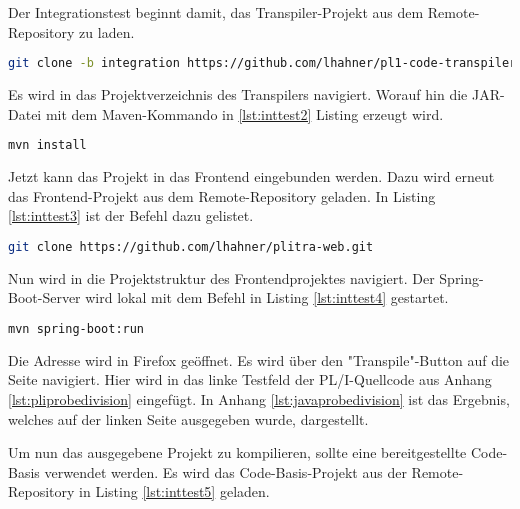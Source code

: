 Der Integrationstest beginnt damit, das Transpiler-Projekt aus dem Remote-Repository zu laden.

\begin{lstlisting}[language=Bash, caption=Laden des Transpilers, label={lst:inttest1}]
git clone -b integration https://github.com/lhahner/pl1-code-transpiler.git
\end{lstlisting} 

Es wird in das Projektverzeichnis des Transpilers navigiert. Worauf hin die JAR-Datei mit dem Maven-Kommando in \ref{lst:inttest2} Listing erzeugt wird.

\begin{lstlisting}[language=Bash, caption=Erzeugen der JAR, label={lst:inttest2}]
mvn install
\end{lstlisting}

Jetzt kann das Projekt in das Frontend eingebunden werden. Dazu wird erneut das Frontend-Projekt aus dem Remote-Repository geladen. In Listing \ref{lst:inttest3} ist der Befehl dazu gelistet.

\begin{lstlisting}[language=Bash, caption=Laden des Frontend-Projekts, label={lst:inttest3}]
git clone https://github.com/lhahner/plitra-web.git
\end{lstlisting}

Nun wird in die Projektstruktur des Frontendprojektes navigiert. Der Spring-Boot-Server wird lokal mit dem Befehl in Listing \ref{lst:inttest4} gestartet.

\begin{lstlisting}[language=Bash, caption=Starten des Spring-Boot-Servers, label={lst:inttest4}]
mvn spring-boot:run
\end{lstlisting}

Die Adresse  wird in Firefox geöffnet. Es wird über den "Transpile"-Button auf die Seite  navigiert. Hier wird in das linke Testfeld der PL/I-Quellcode aus Anhang \ref{lst:pliprobedivision} eingefügt. In Anhang \ref{lst:javaprobedivision} ist das Ergebnis, welches auf der linken Seite ausgegeben wurde, dargestellt.

Um nun das ausgegebene Projekt zu kompilieren, sollte eine bereitgestellte Code-Basis verwendet werden. Es wird das Code-Basis-Projekt aus der Remote-Repository in Listing \ref{lst:inttest5} geladen.

